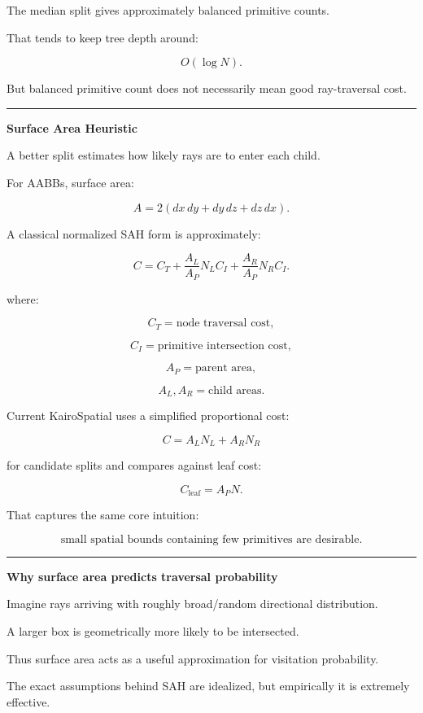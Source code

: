 The median split gives approximately balanced primitive counts.

That tends to keep tree depth around:

\[
O(\log N).
\]

But balanced primitive count does not necessarily mean good ray-traversal cost.

\begin{center}\rule{0.5\linewidth}{0.5pt}\end{center}

\textbf{Surface Area Heuristic}

A better split estimates how likely rays are to enter each child.

For AABBs, surface area:

\[
A=
2(
dx\,dy+
dy\,dz+
dz\,dx
).
\]

A classical normalized SAH form is approximately:

\[
C=
C_T
+
\frac{A_L}{A_P}N_LC_I
+
\frac{A_R}{A_P}N_RC_I.
\]

where:

\[
C_T=\text{node traversal cost},
\]

\[
C_I=\text{primitive intersection cost},
\]

\[
A_P=\text{parent area},
\]

\[
A_L,A_R=\text{child areas}.
\]

Current KairoSpatial uses a simplified proportional cost:

\[
\boxed{
C=
A_LN_L+
A_RN_R
}
\]

for candidate splits and compares against leaf cost:

\[
C_{\text{leaf}}
=
A_PN.
\]

That captures the same core intuition:

\[
\boxed{
\text{small spatial bounds containing few primitives are desirable}.
}
\]

\begin{center}\rule{0.5\linewidth}{0.5pt}\end{center}

\textbf{Why surface area predicts traversal probability}

Imagine rays arriving with roughly broad/random directional distribution.

A larger box is geometrically more likely to be intersected.

Thus surface area acts as a useful approximation for visitation probability.

The exact assumptions behind SAH are idealized, but empirically it is extremely effective.


